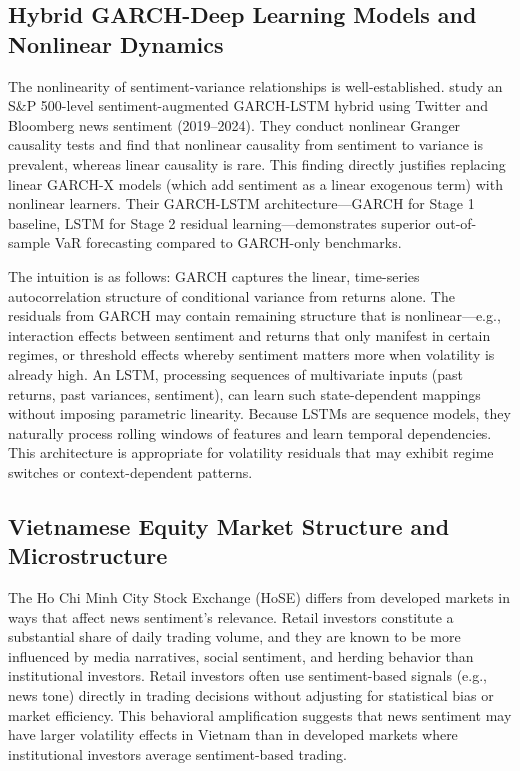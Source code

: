 \subsection{Hybrid GARCH-Deep Learning Models and Nonlinear Dynamics}

The nonlinearity of sentiment-variance relationships is well-established. \citet{leber2025nonlinear} study an S\&P 500-level sentiment-augmented GARCH-LSTM hybrid using Twitter and Bloomberg news sentiment (2019--2024). They conduct nonlinear Granger causality tests and find that nonlinear causality from sentiment to variance is prevalent, whereas linear causality is rare. This finding directly justifies replacing linear GARCH-X models (which add sentiment as a linear exogenous term) with nonlinear learners. Their GARCH-LSTM architecture—GARCH for Stage 1 baseline, LSTM for Stage 2 residual learning—demonstrates superior out-of-sample VaR forecasting compared to GARCH-only benchmarks.

The intuition is as follows: GARCH captures the linear, time-series autocorrelation structure of conditional variance from returns alone. The residuals from GARCH may contain remaining structure that is nonlinear—e.g., interaction effects between sentiment and returns that only manifest in certain regimes, or threshold effects whereby sentiment matters more when volatility is already high. An LSTM, processing sequences of multivariate inputs (past returns, past variances, sentiment), can learn such state-dependent mappings without imposing parametric linearity. Because LSTMs are sequence models, they naturally process rolling windows of features and learn temporal dependencies. This architecture is appropriate for volatility residuals that may exhibit regime switches or context-dependent patterns.

\subsection{Vietnamese Equity Market Structure and Microstructure}

The Ho Chi Minh City Stock Exchange (HoSE) differs from developed markets in ways that affect news sentiment's relevance. Retail investors constitute a substantial share of daily trading volume, and they are known to be more influenced by media narratives, social sentiment, and herding behavior than institutional investors. Retail investors often use sentiment-based signals (e.g., news tone) directly in trading decisions without adjusting for statistical bias or market efficiency. This behavioral amplification suggests that news sentiment may have larger volatility effects in Vietnam than in developed markets where institutional investors average sentiment-based trading.

